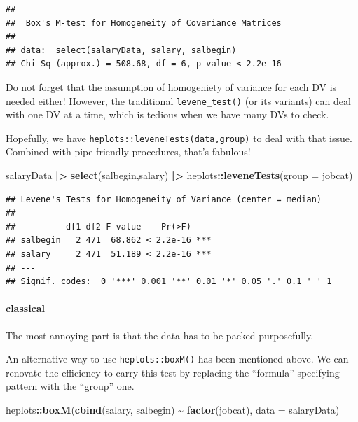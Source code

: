 \documentclass[
]{ctexart}
\newenvironment{Shaded}{\begin{snugshade}}{\end{snugshade}}
\newcommand{\AttributeTok}[1]{\textcolor[rgb]{0.13,0.29,0.53}{#1}}
\newcommand{\FunctionTok}[1]{\textcolor[rgb]{0.13,0.29,0.53}{\textbf{#1}}}
\newcommand{\NormalTok}[1]{#1}
\newcommand{\SpecialCharTok}[1]{\textcolor[rgb]{0.81,0.36,0.00}{\textbf{#1}}}
\begin{document}
\begin{verbatim}
## 
##  Box's M-test for Homogeneity of Covariance Matrices
## 
## data:  select(salaryData, salary, salbegin)
## Chi-Sq (approx.) = 508.68, df = 6, p-value < 2.2e-16
\end{verbatim}

Do not forget that the assumption of homogeniety of variance for each DV
is needed either! However, the traditional \texttt{levene\_test()} (or
its variants) can deal with one DV at a time, which is tedious when we
have many DVs to check.

Hopefully, we have \texttt{heplots::leveneTests(data,group)} to deal
with that issue. Combined with pipe-friendly procedures, that's
fabulous!

\begin{Shaded}
\begin{Highlighting}[]
\NormalTok{salaryData }\SpecialCharTok{|\textgreater{}}  \FunctionTok{select}\NormalTok{(salbegin,salary) }\SpecialCharTok{|\textgreater{}} 
\NormalTok{  heplots}\SpecialCharTok{::}\FunctionTok{leveneTests}\NormalTok{(}\AttributeTok{group =}\NormalTok{ jobcat)}
\end{Highlighting}
\end{Shaded}

\begin{verbatim}
## Levene's Tests for Homogeneity of Variance (center = median)
## 
##          df1 df2 F value    Pr(>F)    
## salbegin   2 471  68.862 < 2.2e-16 ***
## salary     2 471  51.189 < 2.2e-16 ***
## ---
## Signif. codes:  0 '***' 0.001 '**' 0.01 '*' 0.05 '.' 0.1 ' ' 1
\end{verbatim}

\hypertarget{classical}{%
\paragraph{classical}\label{classical}}

The most annoying part is that the data has to be packed purposefully.

An alternative way to use \texttt{heplots::boxM()} has been mentioned
above. We can renovate the efficiency to carry this test by replacing
the ``formula'' specifying-pattern with the ``group'' one.

\begin{Shaded}
\begin{Highlighting}[]
\NormalTok{heplots}\SpecialCharTok{::}\FunctionTok{boxM}\NormalTok{(}\FunctionTok{cbind}\NormalTok{(salary, salbegin) }\SpecialCharTok{\textasciitilde{}} \FunctionTok{factor}\NormalTok{(jobcat), }
              \AttributeTok{data =}\NormalTok{ salaryData)}
\end{Highlighting}
\end{Shaded}
\end{document}
